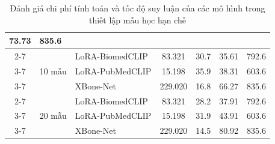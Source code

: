 \begin{table}[htbp]
{\begin{tabular}{|c|l|l|c|c|c|c|}
  \cellcolor{gray!12}73.73 &
  \cellcolor{gray!12}835.6 \\ \cline{2-7} 
 &
  \multirow{3}{*}{10 mẫu} &
  LoRA-BiomedCLIP &
  83.321 &
  30.7 &
  35.61 &
  792.6 \\ \cline{3-7} 
 &
   &
  LoRA-PubMedCLIP &
  15.198 &
  35.9 &
  38.31 &
  603.6 \\ \cline{3-7} 
 &
   &
  \cellcolor{gray!12}XBone-Net &
  \cellcolor{gray!12}229.020 &
  \cellcolor{gray!12}16.8 &
  \cellcolor{gray!12}66.27 &
  \cellcolor{gray!12}835.6 \\ \cline{2-7} 
 &
  \multirow{3}{*}{20 mẫu} &
  LoRA-BiomedCLIP &
  83.321 &
  28.2 &
  37.91 &
  792.6 \\ \cline{3-7} 
 &
   &
  LoRA-PubMedCLIP &
  15.198 &
  31.9 &
  43.91 &
  603.6 \\ \cline{3-7} 
 &
   &
  \cellcolor{gray!12}XBone-Net &
  \cellcolor{gray!12}229.020 &
  \cellcolor{gray!12}14.5 &
  \cellcolor{gray!12}80.92 &
  \cellcolor{gray!12}835.6 \\ \hline
\end{tabular}%
}
\caption{Đánh giá chi phí tính toán và tốc độ suy luận của các mô hình trong thiết lập mẫu học hạn chế}
\label{tab:efficiency_few_shot_compute}
\end{table}
